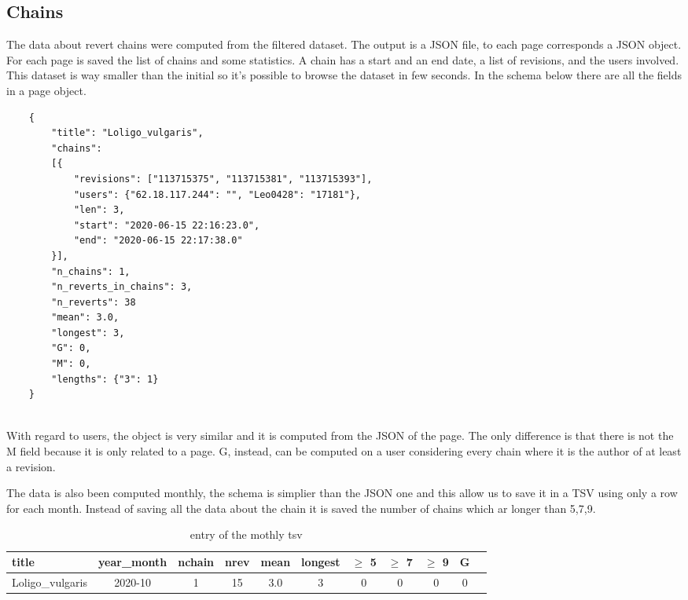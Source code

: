 \subsection{Chains}
The data about revert chains were computed from the filtered dataset. The output is a JSON file, to
each page corresponds a JSON object. For each page is saved the list of chains and some statistics.
A chain has a start and an end date, a list of revisions, and the users involved. This dataset is
way smaller than the initial so it's possible to browse the dataset in few seconds.  
In the schema below there are all the fields in a page object. 

\begin{verbatim}
    {
        "title": "Loligo_vulgaris", 
        "chains": 
        [{
            "revisions": ["113715375", "113715381", "113715393"], 
            "users": {"62.18.117.244": "", "Leo0428": "17181"}, 
            "len": 3, 
            "start": "2020-06-15 22:16:23.0", 
            "end": "2020-06-15 22:17:38.0"
        }], 
        "n_chains": 1, 
        "n_reverts_in_chains": 3, 
        "n_reverts": 38
        "mean": 3.0, 
        "longest": 3, 
        "G": 0,
        "M": 0, 
        "lengths": {"3": 1}
    }
    
\end{verbatim}


With regard to users, the object is very similar and it is computed from the JSON of the page. The
only difference is that there is not the M field because it is only related to a page. G, instead,
can be computed on a user considering every chain where it is the author of at least a revision.

The data is also been computed monthly, the schema is simplier than the JSON one and this allow us
to save it in a TSV using only a row for each month. Instead of saving all the data about the chain
it is saved the number of chains which ar longer than 5,7,9.
\begin{table}[H]
    \centering
    \begin{tabularx}{\columnwidth}{@{}Xcccccccccc@{}}
        \midrule
        \textbf{title} & \textbf{year\_month} & \textbf{nchain} & \textbf{nrev} & \textbf{mean} & \textbf{longest} & \textbf{$\geq$ 5} & \textbf{$\geq$ 7} & \textbf{$\geq$ 9} & \textbf{G}\\ \toprule
        Loligo\_vulgaris & 2020-10 & 1 & 15 & 3.0 & 3 & 0 & 0 & 0 & 0\\
        
         \bottomrule
    \end{tabularx}
    
    \caption{entry of the mothly tsv \label{table:chainsPage}}
\end{table}


